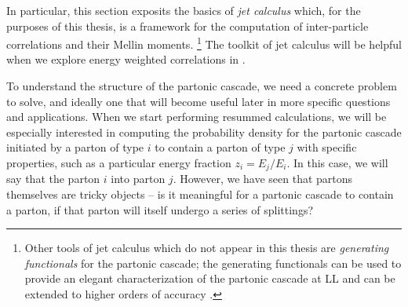 In particular, this section exposits the basics of \textit{jet calculus} \cite{Konishi:1978dg,Konishi:1978yx,Konishi:1978ks} which, for the purposes of this thesis, is a framework for the computation of inter-particle correlations and their Mellin moments.%
\footnote{
    Other tools of jet calculus which do not appear in this thesis are \textit{generating functionals} for the partonic cascade;
    the generating functionals can be used to provide an elegant characterization of the partonic cascade at LL and can be extended to higher orders of accuracy \cite{vanBeekveld:2023lsa}.
}
%
The toolkit of jet calculus will be helpful when we explore energy weighted correlations in .



To understand the structure of the partonic cascade, we need a concrete problem to solve, and ideally one that will become useful later in more specific questions and applications.
%
When we start performing resummed calculations, we will be especially interested in computing the probability density for the partonic cascade initiated by a parton of type \(i\) to contain a parton of type \(j\) with specific properties, such as a particular energy fraction \(z_i = E_j/E_i\).
%
In this case, we will say that the parton \(i\)  into parton \(j\).
%
However, we have seen that partons themselves are tricky objects -- is it meaningful for a partonic cascade to contain a parton, if that parton will itself undergo a series of splittings?


